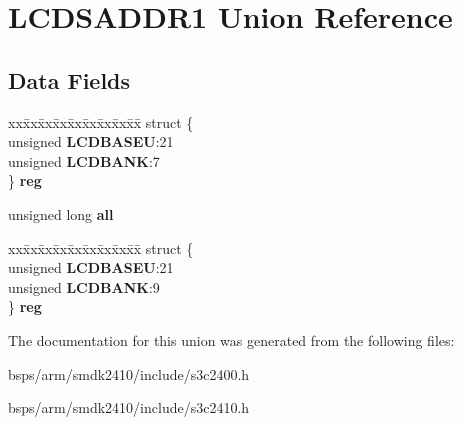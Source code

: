\hypertarget{unionLCDSADDR1}{}\section{L\+C\+D\+S\+A\+D\+D\+R1 Union Reference}
\label{unionLCDSADDR1}
\subsection*{Data Fields}
\begin{DoxyCompactItemize}
\item 
\mbox{\label{unionLCDSADDR1_a41f8bb2ec588307cfbe86ee83ada4da2}} 
\begin{tabbing}
xx\=xx\=xx\=xx\=xx\=xx\=xx\=xx\=xx\=\kill
struct \{\\
\>unsigned {\bfseries LCDBASEU}:21\\
\>unsigned {\bfseries LCDBANK}:7\\
\} {\bfseries reg}\\

\end{tabbing}\item 
\mbox{\label{unionLCDSADDR1_a85a421a4057e88d38763f6409c922221}} 
unsigned long {\bfseries all}
\item 
\mbox{\label{unionLCDSADDR1_a0eec7a9db90d9e9584f36c6c21e30486}} 
\begin{tabbing}
xx\=xx\=xx\=xx\=xx\=xx\=xx\=xx\=xx\=\kill
struct \{\\
\>unsigned {\bfseries LCDBASEU}:21\\
\>unsigned {\bfseries LCDBANK}:9\\
\} {\bfseries reg}\\

\end{tabbing}\end{DoxyCompactItemize}


The documentation for this union was generated from the following files\+:\begin{DoxyCompactItemize}
\item 
bsps/arm/smdk2410/include/s3c2400.\+h\item 
bsps/arm/smdk2410/include/s3c2410.\+h\end{DoxyCompactItemize}
